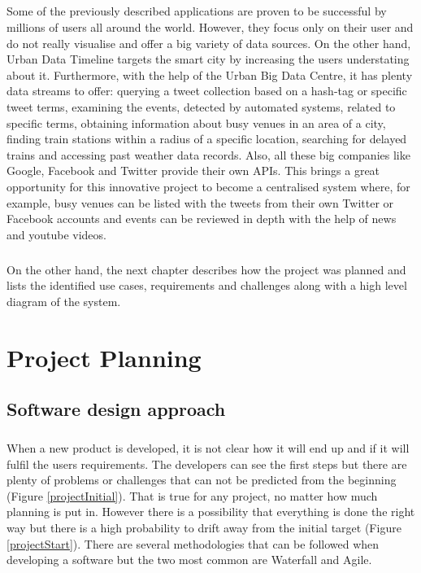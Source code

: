 \documentclass{l4proj}
\begin{document}
\paragraph{}
Some of the previously described applications are proven to be successful by millions of users all around the world. However, they focus only on their user and do not really visualise and offer a big variety of data sources. On the other hand, Urban Data Timeline targets the smart city by increasing the user\textquotesingle s understating about it. Furthermore, with the help of the Urban Big Data Centre, it has plenty data streams to offer: querying a tweet collection based on a hash-tag or specific tweet terms, examining the events, detected by automated systems, related to specific terms, obtaining information about busy venues in an area of a city, finding train stations within a radius of a specific location, searching for delayed trains and accessing past weather data records. Also, all these big companies like Google, Facebook and Twitter provide their own APIs. This brings a great opportunity for this innovative project to become a centralised system where, for example, busy venues can be listed with the tweets from their own Twitter or Facebook accounts and events can be reviewed in depth with the help of news and youtube videos. 
\paragraph{}
On the other hand, the next chapter describes how the project was planned and lists the identified use cases, requirements and challenges along with a high level diagram of the system. 


\chapter{Project Planning}

\section{Software design approach}
\paragraph{}
When a new product is developed, it is not clear how it will end up and if it will fulfil the user\textquotesingle s requirements. The developers can see the first steps but there are plenty of problems or challenges that can not be predicted from the beginning (Figure \ref{projectInitial}). That is true for any project, no matter how much planning is put in. However there is a possibility that everything is done the right way but there is a high probability to drift away from the initial target (Figure \ref{projectStart}). There are several methodologies that can be followed when developing a software but the two most common are Waterfall and Agile. 
\end{document}
